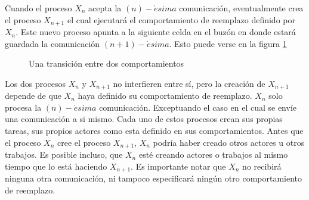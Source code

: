 
Cuando el proceso $X_n$ acepta la $(n)-\acute{e}sima$ comunicación, eventualmente crea el proceso $X_{n+1}$ el cual ejecutará el comportamiento de reemplazo definido por $X_n$. Este nuevo proceso apunta a la siguiente celda en el buzón en donde estará guardada la comunicación $(n+1)-\acute{e}sima$. Esto puede verse en la figura \ref{fig:actortransition}

\begin{figure}[H]
\caption{Una transición entre dos comportamientos}
\label{fig:actortransition}
\end{figure}

Los dos procesos $X_n$ y $X_{n+1}$ no interfieren entre sí, pero la creación de $X_{n+1}$ depende de que $X_{n}$ haya definido su comportamiento de reemplazo. $X_n$ solo procesa la $(n)-\acute{e}sima$ comunicación. Exceptuando el caso en el cual se envíe una comunicación a si mismo. Cada uno de estos procesos crean sus propias tareas, sus propios actores como esta definido en sus comportamientos. Antes que el proceso $X_n$ cree el proceso $X_{n+1}$, $X_n$ podría haber creado otros actores u otros trabajos. Es posible incluso, que $X_n$ esté creando actores o trabajos al mismo tiempo que lo está haciendo $X_{n+1}$. Es importante notar que $X_n$ no recibirá ninguna otra comunicación, ni tampoco especificará ningún otro comportamiento de reemplazo.

